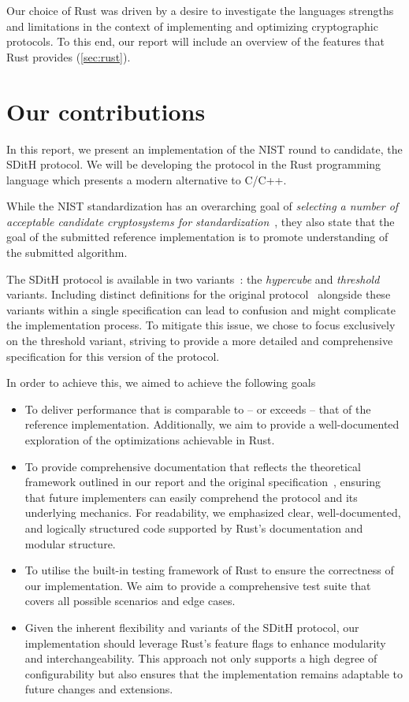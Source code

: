 \documentclass[11pt]{report}
\theoremstyle{definition}
\theoremstyle{plain}
\begin{document}
Our choice of Rust was driven by a desire to investigate the languages strengths and limitations in the context of implementing and optimizing cryptographic protocols. To this end, our report will include an overview of the features that Rust provides (\autoref{sec:rust}).

\section{Our contributions}

In this report, we present an implementation of the NIST round to candidate, the SDitH protocol. We will be developing the protocol in the Rust programming language which presents a modern alternative to C/C++.

While the NIST standardization has an overarching goal of \textit{selecting a number of acceptable candidate cryptosystems for standardization}~\cite{nistcall}, they also state that the goal of the submitted reference implementation is to promote understanding of the submitted algorithm.

The SDitH protocol is available in two variants~\cite{aguilarsyndrome11}: the \textit{hypercube} and \textit{threshold} variants. Including distinct definitions for the original protocol~\cite{feneuil2022syndrome} alongside these variants within a single specification can lead to confusion and might complicate the implementation process. To mitigate this issue, we chose to focus exclusively on the threshold variant, striving to provide a more detailed and comprehensive specification for this version of the protocol.

In order to achieve this, we aimed to achieve the following goals

\begin{itemize}
  \item To deliver performance that is comparable to -- or exceeds -- that of the reference implementation. Additionally, we aim to provide a well-documented exploration of the optimizations achievable in Rust.
  \item To provide comprehensive documentation that reflects the theoretical framework outlined in our report and the original specification~\cite{aguilarsyndrome11}, ensuring that future implementers can easily comprehend the protocol and its underlying mechanics. For readability, we emphasized clear, well-documented, and logically structured code supported by Rust's documentation and modular structure.
  \item To utilise the built-in testing framework of Rust to ensure the correctness of our implementation. We aim to provide a comprehensive test suite that covers all possible scenarios and edge cases.
  \item Given the inherent flexibility and variants of the SDitH protocol, our implementation should leverage Rust's feature flags to enhance modularity and interchangeability. This approach not only supports a high degree of configurability but also ensures that the implementation remains adaptable to future changes and extensions.
\end{itemize}
\end{document}
